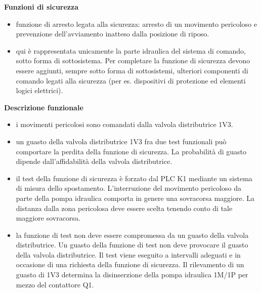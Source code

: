 \textbf{Funzioni di sicurezza}
\begin{itemize}
    \item funzione di arresto legata alla sicurezza: arresto di un movimento pericoloso e prevenzione dell'avviamento inatteso dalla posizione di riposo.
    \item qui è rappresentata unicamente la parte idraulica del sistema di comando, sotto forma di sottosistema. Per completare la funzione di sicurezza devono essere aggiunti, sempre sotto forma di sottosistemi, ulteriori componenti di comando legati alla sicurezza (per es. dispositivi di protezione ed elementi logici elettrici).
\end{itemize}

\textbf{Descrizione funzionale}
\begin{itemize}
    \item i movimenti pericolosi sono comandati dalla valvola distributrice 1V3.
    \item un guasto della valvola distributrice 1V3 fra due test funzionali può comportare la perdita della funzione di sicurezza. La probabilità di guasto dipende dall'affidabilità della valvola distributrice.
    \item il test della funzione di sicurezza è forzato dal PLC K1 mediante un sistema di misura dello spostamento. L'interruzione del movimento pericoloso da parte della pompa idraulica comporta in genere una sovracorsa maggiore. La distanza dalla zona pericolosa deve essere scelta tenendo conto di tale maggiore sovracorsa.
    \item la funzione di test non deve essere compromessa da un guasto della valvola distributrice. Un guasto della funzione di test non deve provocare il guasto della valvola distributrice. Il test viene eseguito a intervalli adeguati e in occasione di una richiesta della funzione di sicurezza. Il rilevamento di un guasto di 1V3 determina la disinserzione della pompa idraulica 1M/1P per mezzo del contattore Q1.
\end{itemize}

